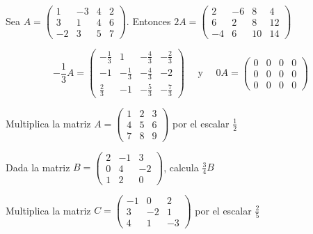 \begin{example}
Sea $A=\left(\begin{array}{rrrr}1 & -3 & 4 & 2 \\ 3 & 1 & 4 & 6 \\ -2 & 3 & 5 & 7\end{array}\right)$. Entonces $2 A=\left(\begin{array}{rrrr}2 & -6 & 8 & 4 \\ 6 & 2 & 8 & 12 \\ -4 & 6 & 10 & 14\end{array}\right)$
\end{example}
\begin{example}
    $$
-\frac{1}{3} A = \left( \begin{array}{rrrr}
-\frac{1}{3} & 1 & -\frac{4}{3} & -\frac{2}{3} \\
-1 & -\frac{1}{3} & -\frac{4}{3} & -2 \\
\frac{2}{3} & -1 & -\frac{5}{3} & -\frac{7}{3} 
\end{array}\right) \quad \text { y } \quad 0 A=\left(\begin{array}{llll}
0 & 0 & 0 & 0 \\
0 & 0 & 0 & 0 \\
0 & 0 & 0 & 0
\end{array}\right)
$$
\end{example}
\begin{exercise}
Multiplica la matriz \( A = \begin{pmatrix} 1 & 2 & 3 \\ 4 & 5 & 6 \\ 7 & 8 & 9 \end{pmatrix} \) por el escalar \( \frac{1}{2} \)
\end{exercise}
\begin{exercise}
 Dada la matriz \( B = \begin{pmatrix} 2 & -1 & 3 \\ 0 & 4 & -2 \\ 1 & 2 & 0 \end{pmatrix} \), calcula \( \frac{3}{4}B \)   
\end{exercise}
\begin{exercise}
 Multiplica la matriz \( C = \begin{pmatrix} -1 & 0 & 2 \\ 3 & -2 & 1 \\ 4 & 1 & -3 \end{pmatrix} \) por el escalar \( \frac{2}{5} \)   
\end{exercise}

